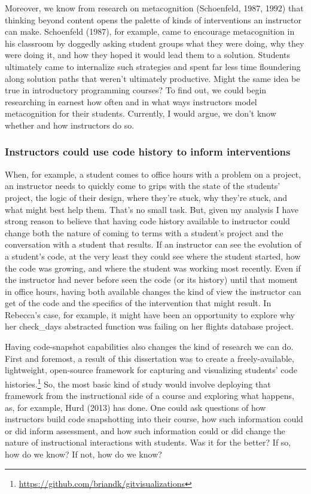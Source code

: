 Moreover, we know from research on metacognition (Schoenfeld, 1987, 1992) that thinking beyond content opens the palette of kinds of interventions an instructor can make. Schoenfeld (1987), for example, came to encourage metacognition in his classroom by doggedly asking student groups what they were doing, why they were doing it, and how they hoped it would lead them to a solution. Students ultimately came to internalize such strategies and spent far less time floundering along solution paths that weren't ultimately productive. Might the same idea be true in introductory programming courses? To find out, we could begin researching in earnest how often and in what ways instructors model metacognition for their students. Currently, I would argue, we don't know whether and how instructors do so.

\subsubsection{Instructors could use code history to inform interventions}\label{instructors-could-use-code-history-to-inform-interventions}

When, for example, a student comes to office hours with a problem on a project, an instructor needs to quickly come to grips with the state of the students' project, the logic of their design, where they're stuck, why they're stuck, and what might best help them. That's no small task. But, given my analysis I have strong reason to believe that having code history available to instructor could change both the nature of coming to terms with a student's project and the conversation with a student that results. If an instructor can see the evolution of a student's code, at the very least they could see where the student started, how the code was growing, and where the student was working most recently. Even if the instructor had never before seen the code (or its history) until that moment in office hours, having both available changes the kind of view the instructor can get of the code and the specifics of the intervention that might result. In Rebecca's case, for example, it might have been an opportunity to explore why her check\_days abstracted function was failing on her flights database project.

Having code-snapshot capabilities also changes the kind of research we can do. First and foremost, a result of this dissertation was to create a freely-available, lightweight, open-source framework for capturing and visualizing students' code histories.\footnote{\url{https://github.com/briandk/gitvisualizations}} So, the most basic kind of study would involve deploying that framework from the instructional side of a course and exploring what happens, as, for example, Hurd (2013) has done. One could ask questions of how instructors build code snapshotting into their course, how such information could or did inform assessment, and how such information could or did change the nature of instructional interactions with students. Was it for the better? If so, how do we know? If not, how do we know?

